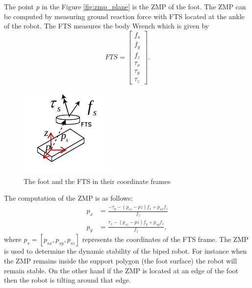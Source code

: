 The point \emph{p} in the Figure \ref{fig:zmp_plane} is the ZMP of the foot. The ZMP can be computed by measuring ground reaction force with FTS located at the ankle of the robot. The FTS measures the body Wrench which is given by $$ FTS = \begin{bmatrix}
f_x \\ f_y \\ f_z\\ \tau_x \\ \tau_y \\ \tau_z
\end{bmatrix}.$$ 
\begin{figure}
	\centering
	\includegraphics[scale=1]{Bilder/zmp_pic.png}
	\caption{The foot and the FTS in their coordinate frames}
\end{figure}

The computation of the ZMP is as follows:
\begin{equation}
	\begin{split}
	p_x &= \frac{-\tau_y -(p_{sz}-p{z})f_x+p_{sx}f_z}{f_z}\\
	p_y &= \frac{\tau_x -(p_{sz}-p{z})f_y+p_{sy}f_z}{f_z},
	\end{split}
\end{equation}
where $p_s = [p_{sx},p_{sy},p_{sz}]$ represents the coordinates of the FTS frame. The ZMP is used to determine the dynamic stability of the biped robot. For instance when the ZMP remains inside the support polygon (the foot surface) the robot will remain stable. On the other hand if the ZMP is located at an edge of the foot then the robot is tilting around that edge.